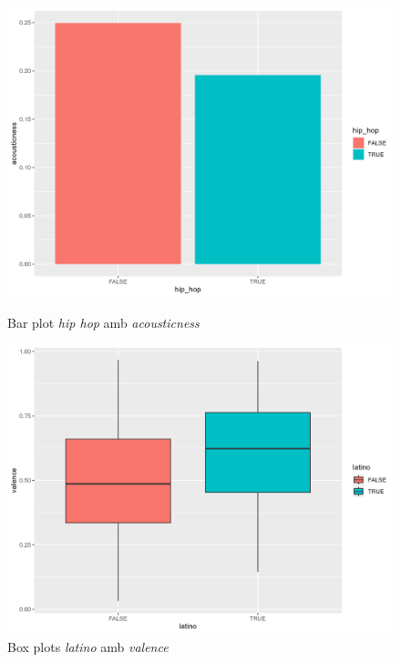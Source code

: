 \begin{figure}[H]
\centering
    \begin{minipage}{.4\textwidth}
        \centering
        \includegraphics[width=0.95\linewidth]{Images/2_Bivariate/hiphopacoustic.png}
        \caption{Bar plot \textit{hip hop} amb \textit{acousticness}}
        \label{fig:BivariateR_hipacoustic}
    \end{minipage}%
    \begin{minipage}{.4\textwidth}
        \centering
        \includegraphics[width=0.95\linewidth]{Images/2_Bivariate/latinovalence.png}
        \caption{Box plots \textit{latino} amb \textit{valence}}
        \label{fig:BivariateR_latinoval}
    \end{minipage}%
\end{figure}


